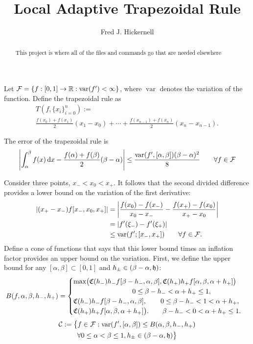 \documentclass{amsart}
\DeclareMathOperator{\Var}{var}
\begin{document}
\title{Local Adaptive Trapezoidal Rule}
\author{Fred J. Hickernell}
\begin{abstract}This project is where all of the files and commands go that are needed elsewhere
\end{abstract}

\maketitle

Let $\cf = \{ f:[0,1] \to \reals : \Var(f') < \infty\}$, where $\Var$ denotes the variation of the function.  Define the trapezoidal rule as
\begin{multline}
    T(f,\{x_i\}_{i=0}^n) := \\
    \frac{f(x_0)+f(x_1)}{2}(x_1-x_0) + \cdots + \frac{ f(x_{n-1}) +f(x_n)}{2}(x_n - x_{n-1}).
\end{multline}

The error of the trapezoidal rule is
\begin{equation}
    \left \lvert \int_{\alpha}^{\beta} f(x) \, \dif x - \frac{f(\alpha)+f(\beta)}{2}(\beta - \alpha) \right \rvert \le \frac{\Var(f',[\alpha,\beta])(\beta - \alpha)^2}{8} \qquad \forall f \in \cf
\end{equation}

Consider three points, $x_- < x_0 < x_+$.  It follows that the second divided difference provides a lower bound on the variation of the first derivative:
\begin{align*}
	\abs{(x_+-x_-)f[x_-,x_0,x_+]}  & =
    \abs{ \frac{f(x_0) - f(x_-)}{x_0 - x_-} - \frac{f(x_+) - f(x_0)}{x_+ - x_0}}
    \\
    & = \abs{f'(\xi_-) - f'(\xi_+)} \\
    & \le \Var(f';[x_-,x_+]) \qquad \forall f \in \cf.
\end{align*}
Define a cone of functions that says that this lower bound times an inflation factor provides an upper bound on the variation.   First, we define the upper bound for any $[\alpha,\beta] \subset [0,1]$ and $h_{\pm} \in  (\beta - \alpha, \mathfrak{h})$:
\begin{equation}
	B(f,\alpha,\beta,h_-, h_+) =
	\begin{cases}
		\max\bigl( \fC(h_-)h_- f[\beta- h_-, \alpha, \beta],\fC(h_+)h_+ f[\alpha, \beta, \alpha + h_+]\bigr) \\
		\hspace{20ex} 0 \le \beta- h_- < \alpha + h_+ \le 1, \\
		\fC(h_-)h_- f[\beta- h_-, \alpha, \beta], \qquad 0 \le \beta- h_- < 1 < \alpha + h_+, \\
		\fC(h_+)h_+ f[\alpha, \beta, \alpha + h_+]\bigr). \qquad \beta - h_- < 0 < \alpha + h_+ \le 1.
	\end{cases}
\end{equation}
\begin{multline}
    \cc : =  \bigl\{ f \in \cf : \Var(f',[\alpha,\beta]) \le  B(\alpha,\beta,h_-, h_+) \\
    \forall 0 \le \alpha < \beta \le 1, h_{\pm} \in  (\beta - \alpha, \fh) \bigr\}
\end{multline}
\end{document}

